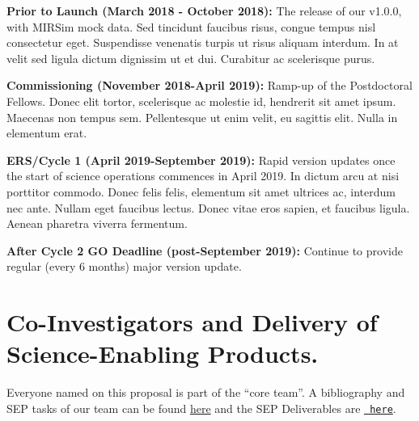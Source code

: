 \smallskip
\smallskip
\noindent
 {\bf Prior to Launch (March 2018 - October 2018):} 
The release of our v1.0.0, with MIRSim mock data. 
Sed tincidunt faucibus risus, congue tempus nisl consectetur eget. Suspendisse venenatis turpis ut risus aliquam interdum. In at velit sed ligula dictum dignissim ut et dui. Curabitur ac scelerisque purus.

\smallskip
\smallskip
\noindent
{\bf Commissioning (November 2018-April 2019):} 
Ramp-up of the Postdoctoral Fellows. 
Donec elit tortor, scelerisque ac molestie id, hendrerit sit amet
ipsum. Maecenas non tempus sem. Pellentesque ut enim velit, eu
sagittis elit. Nulla in elementum erat.

\smallskip
\smallskip
\noindent
{\bf ERS/Cycle 1 (April 2019-September 2019):} 
Rapid version updates once the start of science operations commences
in April 2019.  In dictum arcu at nisi porttitor commodo. Donec felis
felis, elementum sit amet ultrices ac, interdum nec ante. Nullam eget
faucibus lectus. Donec vitae eros sapien, et faucibus ligula. Aenean
pharetra viverra fermentum.

\smallskip
\smallskip
\noindent
{\bf After Cycle 2 GO Deadline (post-September 2019):} 
Continue to provide regular (every 6 months) major version update.

\section*{Co-Investigators and Delivery of Science-Enabling Products.}
\vspace{-6pt}
Everyone named on this proposal is part of the ``core team''.  A
bibliography and SEP tasks of our team can be found
\href{https://github.com/d80b2t/JWST_ERS/blob/master/Proposal/CoI_bios.tex}{here}
and the SEP Deliverables are
\href{https://github.com/d80b2t/JWST_ERS/tree/master/Deliverables}{\tt
here}.

%



